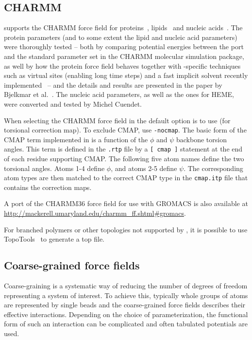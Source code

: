 \subsection{CHARMM}
\label{subsec:charmmff}

{\gromacs} supports the CHARMM force field for proteins~\cite{mackerell04, mackerell98}, lipids~\cite{feller00} and nucleic acids~\cite{foloppe00,Mac2000}. The protein parameters (and to some extent the lipid and nucleic acid parameters) were thoroughly tested -- both by comparing potential energies between the port and the standard parameter set in the CHARMM molecular simulation package, as well by how the protein force field behaves together with {\gromacs}-specific techniques such as virtual sites (enabling long time steps) and a fast implicit solvent recently implemented~\cite{Larsson10} -- and the details and results are presented in the paper by Bjelkmar et al.~\cite{Bjelkmar10}. The nucleic acid parameters, as well as the ones for HEME, were converted and tested by Michel Cuendet.

When selecting the CHARMM force field in {\tt {}} the default option is to use  (for torsional correction map). To exclude CMAP, use {\tt -nocmap}. The basic form of the CMAP term implemented in {\gromacs} is a function of the $\phi$ and $\psi$ backbone torsion angles. This term is defined in the {\tt .rtp} file by a {\tt [ cmap ]} statement at the end of each residue supporting CMAP. The following five atom names define the two torsional angles. Atoms 1-4 define $\phi$, and atoms 2-5 define $\psi$. The corresponding atom types are then matched to the correct CMAP type in the {\tt cmap.itp} file that contains the correction maps.

A port of the CHARMM36 force field for use with GROMACS is also available at \url{http://mackerell.umaryland.edu/charmm_ff.shtml#gromacs}.

For branched polymers or other topologies not supported by {\tt {}}, it is possible to use TopoTools~\cite{kohlmeyer2016} to generate a {\gromacs} top file.

\subsection{Coarse-grained force fields}
\label{sec:cg-forcefields}
Coarse-graining is a systematic way of reducing the number of degrees of freedom representing a system of interest. To achieve this, typically whole groups of atoms are represented by single beads and the coarse-grained force fields describes their effective interactions. Depending on the choice of parameterization, the functional form of such an interaction can be complicated and often tabulated potentials are used.

